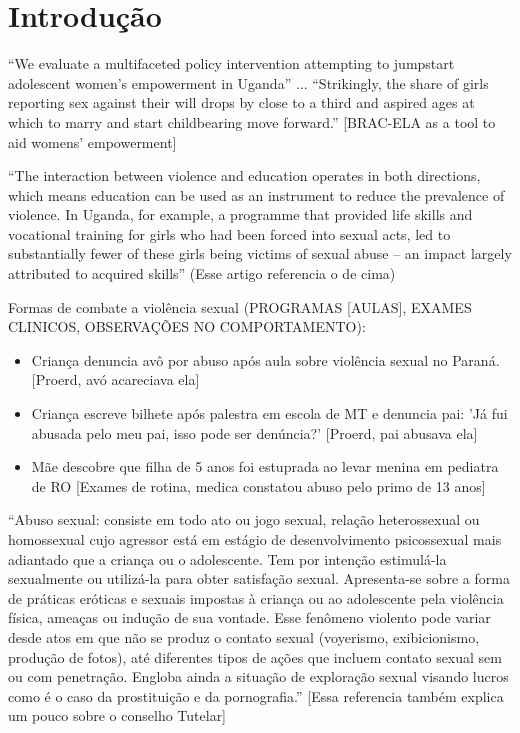 \chapter{Introdução}\label{Capitulo:Introducao}

``We evaluate a multifaceted policy intervention attempting to jumpstart adolescent women’s empowerment in Uganda'' ... ``Strikingly, the share of girls reporting sex against their will drops by close to a third and aspired ages at which to marry and start childbearing move forward.'' \cite{bandiera2017women} [BRAC-ELA as a tool to aid womens’ empowerment]

``The interaction between violence and education operates in both directions, which means education can be used as an instrument to reduce the prevalence of violence. In Uganda, for example, a programme that provided life skills and vocational training for girls who had been forced into sexual acts, led to substantially fewer of these girls being victims of sexual abuse – an impact largely attributed to acquired skills''  \cite{owidviolenceagainstrightsforchildren} (Esse artigo referencia o de cima)


Formas de combate a violência sexual (PROGRAMAS [AULAS], EXAMES CLINICOS, OBSERVAÇÕES NO COMPORTAMENTO):

\begin{itemize}
  \item Criança denuncia avô por abuso após aula sobre violência sexual no Paraná. \cite{central2019crianca} [Proerd, avó acareciava ela]
  \item Criança escreve bilhete após palestra em escola de MT e denuncia pai: 'Já fui abusada pelo meu pai, isso pode ser denúncia?' \cite{lidiane2018crianca} [Proerd, pai abusava ela]
  \item Mãe descobre que filha de 5 anos foi estuprada ao levar menina em pediatra de RO \cite{jonatas2018crianca} [Exames de rotina, medica constatou abuso pelo primo de 13 anos]
\end{itemize}






``Abuso sexual: consiste em todo ato ou jogo sexual, relação heterossexual ou homossexual cujo agressor está em estágio de desenvolvimento psicossexual mais adiantado que a criança ou o adolescente. Tem por intenção estimulá-la sexualmente ou utilizá-la para obter satisfação sexual. Apresenta-se sobre a forma de práticas eróticas e sexuais impostas à criança ou ao adolescente pela violência física, ameaças ou indução de sua vontade. Esse fenômeno violento pode variar desde atos em que não se produz o contato sexual (voyerismo, exibicionismo, produção de fotos), até diferentes tipos de ações que incluem contato sexual sem ou com penetração. Engloba ainda a situação de exploração sexual visando lucros como é o caso da prostituição e da pornografia.'' \cite{saude2002notificacao} [Essa referencia também explica um pouco sobre o conselho Tutelar]


